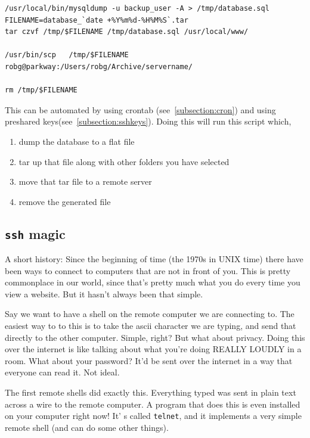 \begin{verbatim}
/usr/local/bin/mysqldump -u backup_user -A > /tmp/database.sql
FILENAME=database_`date +%Y%m%d-%H%M%S`.tar
tar czvf /tmp/$FILENAME /tmp/database.sql /usr/local/www/

/usr/bin/scp   /tmp/$FILENAME robg@parkway:/Users/robg/Archive/servername/

rm /tmp/$FILENAME
\end{verbatim}

This can be automated by using crontab (see~\ref{subsection:cron}) and
using preshared keys(see~\ref{subsection:sshkeys}). Doing this will
run this script which,

\begin{enumerate}
  \item dump the database to a flat file
  \item tar up that file along with other folders you have selected
  \item move that tar file to a remote server
  \item remove the generated file
\end{enumerate}
  

\subsection {{\tt ssh} magic}

A short history: Since the beginning of time (the 1970s in UNIX time) there have been ways
to connect to computers that are not in front of you. This is pretty commonplace in our world, 
since that's pretty much what you do every time you view a website. But it hasn't 
always been that simple.

Say we want to have a shell on the remote computer we are connecting to. The easiest way 
to to this is to take the ascii character we are typing, and send that directly to the other
computer. Simple, right? But what about privacy. Doing this over the internet is like talking
about what you're doing REALLY LOUDLY in a room. What about your password? It'd be sent over the 
internet in a way that everyone can read it. Not ideal. 

The first remote shells did exactly this. Everything typed was sent in plain text across a wire to 
the remote computer. A program that does this is even installed on your computer right now! It' s
called {\tt telnet}, and it implements a very simple remote shell (and can do some other things).

